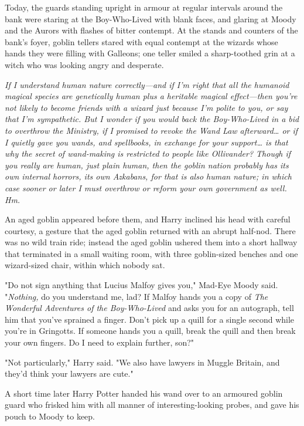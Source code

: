 Today, the guards standing upright in armour at regular intervals around the
bank were staring at the Boy-Who-Lived with blank faces, and glaring at Moody
and the Aurors with flashes of bitter contempt. At the stands and counters of
the bank's foyer, goblin tellers stared with equal contempt at the wizards
whose hands they were filling with Galleons; one teller smiled a sharp-toothed
grin at a witch who was looking angry and desperate.

\emph{If I understand human nature correctly---and if I'm right that all the
humanoid magical species are genetically human plus a heritable magical
effect---then you're not likely to become friends with a wizard just because
I'm polite to you, or say that I'm sympathetic. But I wonder if you would back
the Boy-Who-Lived in a bid to overthrow the Ministry, if I promised to revoke
the Wand Law afterward{\ldots} or if I quietly gave you wands, and spellbooks,
in exchange for your support{\ldots} is that why the secret of wand-making is
restricted to people like Ollivander? Though if you really are human, just
plain human, then the goblin nation probably has its own internal horrors, its
own Azkabans, for that is also human nature; in which case sooner or later I
must overthrow or reform your own government as well. Hm.}

An aged goblin appeared before them, and Harry inclined his head with careful
courtesy, a gesture that the aged goblin returned with an abrupt half-nod.
There was no wild train ride; instead the aged goblin ushered them into a short
hallway that terminated in a small waiting room, with three goblin-sized
benches and one wizard-sized chair, within which nobody sat.

"Do not sign anything that Lucius Malfoy gives you," Mad-Eye Moody said.
"\emph{Nothing,} do you understand me, lad? If Malfoy hands you a copy of
\emph{The Wonderful Adventures of the Boy-Who-Lived} and asks you for an
autograph, tell him that you've sprained a finger. Don't pick up a quill for a
single second while you're in Gringotts. If someone hands you a quill, break
the quill and then break your own fingers. Do I need to explain further, son?"

"Not particularly," Harry said. "We also have lawyers in Muggle Britain, and
they'd think your lawyers are cute."

A short time later Harry Potter handed his wand over to an armoured goblin guard
who frisked him with all manner of interesting-looking probes, and gave his
pouch to Moody to keep.

